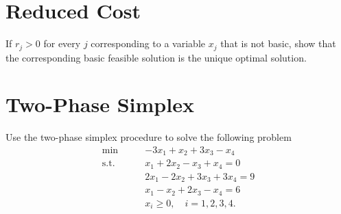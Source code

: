 \documentclass[10pt]{article}
\begin{document}

\section{Reduced Cost}
If $r_j > 0$ for every $j$ corresponding to a variable $x_j$ that is not basic, show that
the corresponding basic feasible solution is the unique optimal solution.


\section{Two-Phase Simplex}
Use the two-phase simplex procedure to solve the following problem
\begin{equation}
	\begin{aligned}
		\min\qquad & -3x_1 + x_2 + 3x_3 - x_4 \\
		\mathrm{s.t.}\qquad & x_1 + 2x_2 -x_3 + x_4 = 0 \\
							& 2x_1 - 2x_2 + 3x_3 + 3x_4 = 9 \\
							& x_1 - x_2 + 2x_3 - x_4 = 6 \\
							& x_i \geq 0,\quad i = 1,2,3,4.
 	\end{aligned}
\end{equation}
\end{document}
